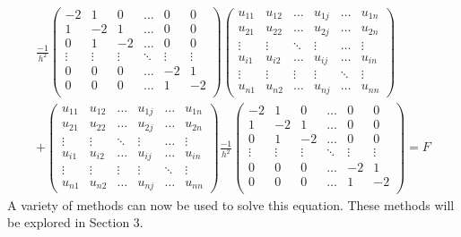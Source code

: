 \documentclass[11pt]{article}
\numberwithin{equation}{section}
\begin{document}
\begin{eqnarray}
\frac{-1}{h^2} 
\begin{pmatrix}
-2 & 1 & 0 & \dots & 0 & 0 \\
1 & -2 & 1 & \dots & 0 & 0 \\
0 & 1 & -2 & \dots & 0 & 0 \\
\vdots & \vdots & \vdots & \ddots & \vdots & \vdots \\
0 & 0 & 0 & \dots & -2 & 1 \\
0 & 0 & 0 & \dots & 1 & -2 \\
\end{pmatrix}
\begin{pmatrix}
u_{11} & u_{12} & \dots & u_{1j} & \dots & u_{1n} \\
u_{21} & u_{22} & \dots & u_{2j} & \dots & u_{2n} \\
\vdots & \vdots & \ddots & \vdots & \dots & \vdots \\
u_{i1} & u_{i2} & \dots & u_{ij} & \dots & u_{in} \\
\vdots & \vdots & \vdots & \vdots & \ddots & \vdots \\
u_{n1} & u_{n2} & \dots & u_{nj} & \dots & u_{nn}
\end{pmatrix} \nonumber \\ \nonumber
+
\begin{pmatrix}
u_{11} & u_{12} & \dots & u_{1j} & \dots & u_{1n} \\
u_{21} & u_{22} & \dots & u_{2j} & \dots & u_{2n} \\
\vdots & \vdots & \ddots & \vdots & \dots & \vdots \\
u_{i1} & u_{i2} & \dots & u_{ij} & \dots & u_{in} \\
\vdots & \vdots & \vdots & \vdots & \ddots & \vdots \\
u_{n1} & u_{n2} & \dots & u_{nj} & \dots & u_{nn}
\end{pmatrix}
\frac{-1}{h^2} 
\begin{pmatrix}
-2 & 1 & 0 & \dots & 0 & 0 \\
1 & -2 & 1 & \dots & 0 & 0 \\
0 & 1 & -2 & \dots & 0 & 0 \\
\vdots & \vdots & \vdots & \ddots & \vdots & \vdots \\
0 & 0 & 0 & \dots & -2 & 1 \\
0 & 0 & 0 & \dots & 1 & -2 \\
\end{pmatrix}
= F
\end{eqnarray}
A variety of methods can now be used to solve this equation. These methods will be explored in Section 3. 
\end{document}
